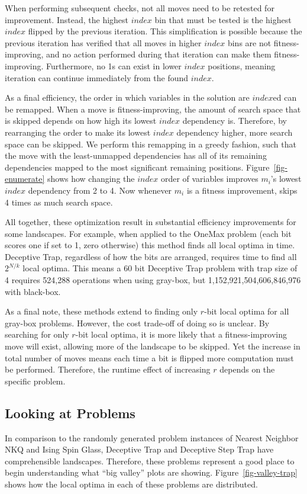 When performing subsequent checks, not all moves need to be retested for improvement. Instead, the highest $index$
bin that must be tested is the highest $index$ flipped by the previous iteration. This
simplification is possible because
the previous iteration has verified that all moves in higher $index$ bins are not fitness-improving, and no action performed during
that iteration can make them fitness-improving. Furthermore, no 1s can exist in lower $index$ positions, meaning
iteration can continue immediately from the found $index$.

As a final efficiency, the order in which variables in the solution are $index$ed can be remapped. When a move is fitness-improving,
the amount of search space that is skipped depends on how high its lowest $index$ dependency is. Therefore,
by rearranging the order to make its lowest $index$ dependency higher, more search space can be skipped. We perform
this remapping in a greedy fashion, such that the move with the least-unmapped dependencies has all of its remaining dependencies
mapped to the most significant remaining positions. Figure~\ref{fig-enumerate} shows how changing the $index$ order of variables
improves $m_i$'s lowest $index$ dependency from 2 to 4. Now whenever $m_i$ is a fitness improvement, 
skips 4 times as much search space.

All together, these optimization result in substantial efficiency improvements for some landscapes. For example, when applied to
the OneMax problem (each bit scores one if set to 1, zero otherwise) this method finds all local optima in  time.
Deceptive Trap, regardless of how the bits are arranged, requires  time to find all $2^{N/k}$ local optima.
This means a 60 bit
Deceptive Trap problem with trap size of 4 requires 524,288 operations when using gray-box, but 1,152,921,504,606,846,976
with black-box.

As a final note, these methods extend to finding only $r$-bit local optima for all gray-box problems. However,
the cost trade-off of doing so is unclear. By searching for only $r$-bit local optima, it is more likely
that a fitness-improving move will exist, allowing more of the landscape to be skipped.
Yet the increase in total number of moves
means each time a bit is flipped more computation must be performed. Therefore, the runtime effect of increasing $r$
depends on the specific problem.

\subsection{Looking at Problems}
In comparison to the randomly generated problem instances of Nearest Neighbor NKQ and Ising Spin Glass,
Deceptive Trap and Deceptive Step Trap have comprehensible landscapes. Therefore, these problems represent
a good place to begin understanding what ``big valley'' plots are showing. Figure~\ref{fig-valley-trap} shows
how the local optima in each of these problems are distributed.

